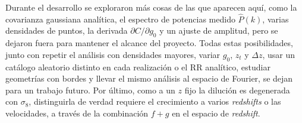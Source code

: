 \documentclass[letterpaper, 12pt]{article}
\newcommand{\RR}{\mathrm{RR}}
\begin{document}
        Durante el desarrollo se exploraron más cosas de las que aparecen aquí, como la covarianza gaussiana analítica, el espectro de potencias medido $\hat P(k)$, varias densidades de puntos, la derivada $\partial C/\partial g_0$ y un ajuste de amplitud, pero se dejaron fuera para mantener el alcance del proyecto. Todas estas posibilidades, junto con repetir el análisis con densidades mayores, variar $g_0$, $z_t$ y $\Delta z$, usar un catálogo aleatorio distinto en cada realización o el $\RR$ analítico, estudiar geometrías con bordes y llevar el mismo análisis al espacio de Fourier, se dejan para un trabajo futuro. Por último, como a un $z$ fijo la dilución es degenerada con $\sigma_8$, distinguirla de verdad requiere el crecimiento a varios \emph{redshifts} o las velocidades, a través de la combinación $f + g$ en el espacio de \emph{redshift}.
\end{document}
